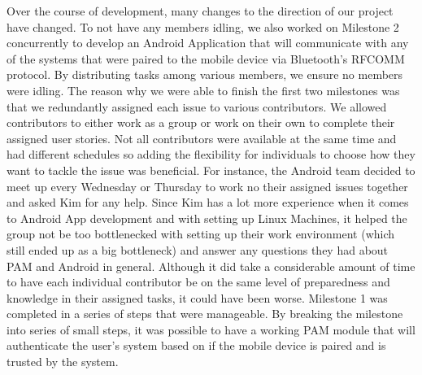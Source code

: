 \documentclass[letterpaper,twocolumn,10pt]{article}
\begin{document}
{{Over the course of development, many changes to the direction of our project have changed. 
To not have any members idling, we also worked on Milestone 2 concurrently to develop an Android Application that will communicate with any of the systems that were paired to the mobile device via Bluetooth's RFCOMM protocol. By distributing tasks among various members, we ensure no members were idling. The reason why we were able to finish the first two milestones was that we redundantly assigned each issue to various contributors. We allowed contributors to either work as a group or work on their own to complete their assigned user stories. Not all contributors were available at the same time and had different schedules so adding the flexibility for individuals to choose how they want to tackle the issue was beneficial. For instance, the Android team decided to meet up every Wednesday or Thursday to work no their assigned issues together and asked Kim for any help. Since Kim has a lot more experience when it comes to Android App development and with setting up Linux Machines, it helped the group not be too bottlenecked with setting up their work environment (which still ended up as a big bottleneck) and answer any questions they had about PAM and Android in general. Although it did take a considerable amount of time to have each individual contributor be on the same level of preparedness and knowledge in their assigned tasks, it could have been worse. Milestone 1 was completed in a series of steps that were manageable. By breaking the milestone into series of small steps, it was possible to have a working PAM module that will authenticate the user's system based on if the mobile device is paired and is trusted by the system.

}}
\end{document}
